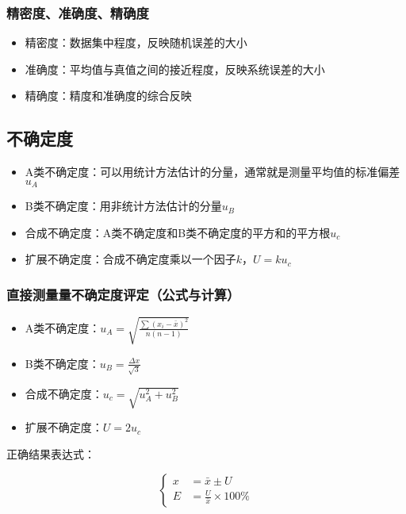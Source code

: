 \documentclass{article}
\begin{document}
\subsubsection{精密度、准确度、精确度}

\begin{itemize}
    \item 精密度：数据集中程度，反映随机误差的大小
    \item 准确度：平均值与真值之间的接近程度，反映系统误差的大小
    \item 精确度：精度和准确度的综合反映
\end{itemize}

\subsection{不确定度}

\begin{itemize}
    \item A类不确定度：可以用统计方法估计的分量，通常就是测量平均值的标准偏差$u_A$
    \item B类不确定度：用非统计方法估计的分量$u_B$
    \item 合成不确定度：A类不确定度和B类不确定度的平方和的平方根$u_c$ 
    \item 扩展不确定度：合成不确定度乘以一个因子$k$，$U = k u_c$
\end{itemize}

\subsubsection{直接测量量不确定度评定（公式与计算）}

\begin{itemize}
    \item A类不确定度：$u_A = \sqrt{\frac{\sum(x_i - \bar{x})^2}{n(n-1)}}$
    \item B类不确定度：$u_B = \frac{\Delta x}{\sqrt{3}}$
    \item 合成不确定度：$u_c = \sqrt{u_A^2 + u_B^2}$
    \item 扩展不确定度：$U = 2 u_c$
\end{itemize}

正确结果表达式：

\begin{equation}
    \left\{
    \begin{aligned}
        x &= \bar{x} \pm U \\
        E &= \frac{U}{\bar{x}} \times 100\%
    \end{aligned}
    \right.
\end{equation}
\end{document}
